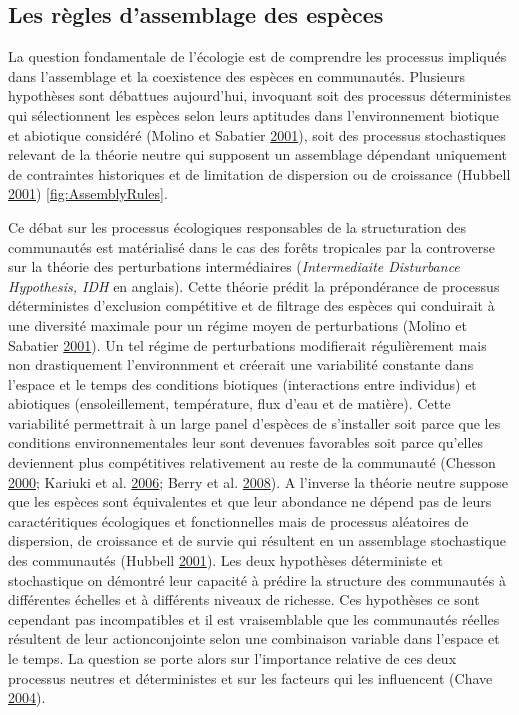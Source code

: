 \documentclass[11pt,french,A4paper,extrafontsizes,onecolumn,openright]{memoir}
\begin{document}
\subsection{Les règles d'assemblage des
espèces}\label{les-regles-dassemblage-des-especes}

La question fondamentale de l'écologie est de comprendre les processus
impliqués dans l'assemblage et la coexistence des espèces en
communautés. Plusieurs hypothèses sont débattues aujourd'hui, invoquant
soit des processus déterministes qui sélectionnent les espèces selon
leurs aptitudes dans l'environnement biotique et abiotique considéré
(Molino et Sabatier \protect\hyperlink{ref-Molino2001}{2001}), soit des
processus stochastiques relevant de la théorie neutre qui supposent un
assemblage dépendant uniquement de contraintes historiques et de
limitation de dispersion ou de croissance (Hubbell
\protect\hyperlink{ref-Hubbell2001}{2001}) \ref{fig:AssemblyRules}.

Ce débat sur les processus écologiques responsables de la structuration
des communautés est matérialisé dans le cas des forêts tropicales par la
controverse sur la théorie des perturbations intermédiaires
(\emph{Intermediaite Disturbance Hypothesis, IDH} en anglais). Cette
théorie prédit la prépondérance de processus déterministes d'exclusion
compétitive et de filtrage des espèces qui conduirait à une diversité
maximale pour un régime moyen de perturbations (Molino et Sabatier
\protect\hyperlink{ref-Molino2001}{2001}). Un tel régime de
perturbations modifierait régulièrement mais non drastiquement
l'environnment et créerait une variabilité constante dans l'espace et le
temps des conditions biotiques (interactions entre individus) et
abiotiques (ensoleillement, température, flux d'eau et de matière).
Cette variabilité permettrait à un large panel d'espèces de s'installer
soit parce que les conditions environnementales leur sont devenues
favorables soit parce qu'elles deviennent plus compétitives relativement
au reste de la communauté (Chesson
\protect\hyperlink{ref-Chesson2000}{2000}; Kariuki et al.
\protect\hyperlink{ref-Kariuki2006a}{2006}; Berry et al.
\protect\hyperlink{ref-Berry2008a}{2008}). A l'inverse la théorie neutre
suppose que les espèces sont équivalentes et que leur abondance ne
dépend pas de leurs caractéritiques écologiques et fonctionnelles mais
de processus aléatoires de dispersion, de croissance et de survie qui
résultent en un assemblage stochastique des communautés (Hubbell
\protect\hyperlink{ref-Hubbell2001}{2001}). Les deux hypothèses
déterministe et stochastique on démontré leur capacité à prédire la
structure des communautés à différentes échelles et à différents niveaux
de richesse. Ces hypothèses ce sont cependant pas incompatibles et il
est vraisemblable que les communautés réelles résultent de leur
actionconjointe selon une combinaison variable dans l'espace et le
temps. La question se porte alors sur l'importance relative de ces deux
processus neutres et déterministes et sur les facteurs qui les
influencent (Chave \protect\hyperlink{ref-Chave2004}{2004}).
\end{document}
